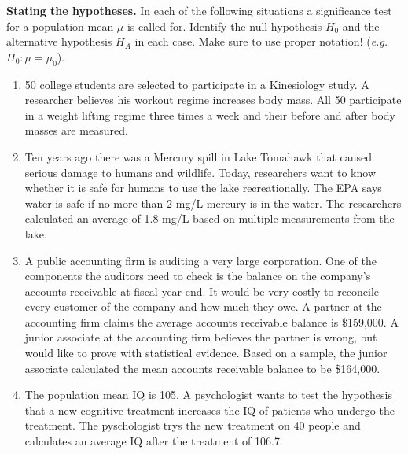 \item \textbf{Stating the hypotheses.} In each of the following situations a significance test for a population mean $\mu$ is called for.  Identify the null hypothesis $H_0$ and the alternative hypothesis $H_A$ in each case. Make sure to use proper notation! (\textit{e.g. $H_0: \mu = \mu_0$}).
	\begin{enumerate}
		\item 50 college students are selected to participate in a Kinesiology study. A researcher believes his workout regime increases body mass. All 50 participate in a weight lifting regime three times a week and their before and after body masses are measured. 

	\item Ten years ago there was a Mercury spill in Lake Tomahawk that caused serious damage to humans and wildlife. Today, researchers want to know whether it is safe for humans to use the lake recreationally. The EPA says water is safe if no more than 2 mg/L mercury is in the water. The researchers calculated an average of 1.8 mg/L based on multiple measurements from the lake.

	\item A public accounting firm is auditing a very large corporation. One of the components the auditors need to check is the balance on the company's accounts receivable at fiscal year end. It would be very costly to reconcile every customer of the company and how much they owe. A partner at the accounting firm claims the average accounts receivable balance is \$159,000. A junior associate at the accounting firm believes the partner is wrong, but would like to prove with statistical evidence. Based on a sample, the junior associate calculated the mean accounts receivable balance to be \$164,000.

		\item The population mean IQ is 105. A psychologist wants to test the hypothesis that a new cognitive treatment increases the IQ of patients who undergo the treatment. The pyschologist trys the new treatment on 40 people and calculates an average IQ after the treatment of 106.7.
	\end{enumerate}